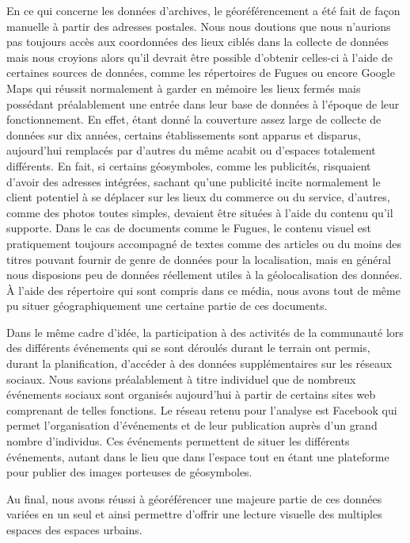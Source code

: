 En ce qui concerne les données d'archives, le géoréférencement a été fait de façon manuelle à partir des adresses postales. 
Nous nous doutions que nous n'aurions pas toujours accès aux coordonnées des lieux ciblés dans la collecte de données mais nous croyions alors qu'il devrait être possible d'obtenir celles-ci à l'aide de certaines sources de données, comme les répertoires de Fugues ou encore Google Maps qui réussit normalement à garder en mémoire les lieux fermés mais possédant préalablement une entrée dans leur base de données à l'époque de leur fonctionnement. 
En effet, étant donné la couverture assez large de collecte de données sur dix années, certains établissements sont apparus et disparus, aujourd'hui remplacés par d'autres du même acabit ou d'espaces totalement différents. 
En fait, si certains géosymboles, comme les publicités, risquaient d'avoir des adresses intégrées, sachant qu'une publicité incite normalement le client potentiel à se déplacer sur les lieux du commerce ou du service, d'autres, comme des photos toutes simples, devaient être situées à l'aide du contenu qu'il supporte.  
Dans le cas de documents comme le Fugues, le contenu visuel est pratiquement toujours accompagné de textes comme des articles ou du moins des titres pouvant fournir de genre de données pour la localisation, mais en général nous disposions peu de données réellement utiles à la géolocalisation des données. 
À l'aide des répertoire qui sont compris dans ce média, nous avons tout de même pu situer géographiquement une certaine partie de ces documents.

Dans le même cadre d'idée, la participation à des activités de la communauté \lgbt{} lors des différents événements qui se sont déroulés durant le terrain ont permis, durant la planification, d'accéder à des données supplémentaires sur les réseaux sociaux. 
Nous savions préalablement à titre individuel que de nombreux événements sociaux sont organisés aujourd'hui à partir de certains sites web comprenant de telles fonctions. 
Le réseau retenu pour l'analyse est Facebook qui permet l'organisation d'événements et de leur publication auprès d'un grand nombre d'individus. 
Ces événements permettent de situer les différents événements, autant dans le lieu que dans l'espace tout en étant une plateforme pour publier des images porteuses de géosymboles.
\citep{Barkhuus2010} \citep{Boyd2010}

Au final, nous avons réussi à géoréférencer une majeure partie de ces données variées en un seul \sig{} et ainsi permettre d'offrir une lecture visuelle des multiples espaces \qus{} des espaces urbains.

